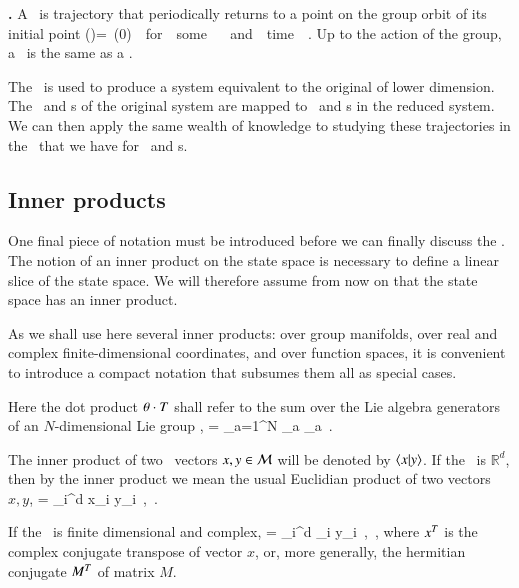 \begin{definition}
\textbf{\Rpo.}
A \rpo\ is trajectory that periodically returns to a point on the group orbit of its initial point
\beq
\ssp(\tau*)=\LieEl \, \ssp(0) \,\, for \,\,  some \,\, \LieEl \in \Group \,\, and \,\, time \,\, \tau*.
\eeq
Up to the action of the group, a \rpo\ is the same as a \po.
\end{definition}

The \mslices\ is used to produce a system equivalent to the original of lower dimension. The \reqva\ and \rpo s of the original system are mapped to \eqva\ and \po s in the reduced system. We can then apply the same wealth of knowledge to studying these trajectories in the \reducedsp\ that we have for \eqva\ and \po s.
    \ifarticle
    \else


\subsection{Inner products}
\label{def:innerProduct}

One final piece of notation must be introduced before we can finally discuss the \mslices.
The notion of an inner product on the state space is necessary to define a linear slice of the state space. We will therefore assume from now on that the state space has an inner product.

As we shall use here several inner products:
over group manifolds, over real and complex finite-dimensional coordinates, and over function spaces, it is convenient to introduce a compact notation that subsumes them all as special cases.

Here the dot product ${\bf \theta} \cdot T$ shall refer to the sum over
the Lie algebra generators of an $N$-dimensional Lie group \Group,
\beq
\gSpace \cdot \Lg = \sum_{a=1}^N \gSpace_a \Lg_a
\,.

The inner product of two \statesp\ vectors $x, y \in {\cal M}$ will be denoted by $\left\langle {x}|{y} \right\rangle$. If the \statesp\ is $\mathbb{R}^d$, then by the inner product we mean the usual Euclidian product of two vectors $x,y$,
\beq
{} = \sum_i^d {x}_i y_i
    \,,\qquad \pS \subset \reals
\,.

If the \statesp\ is finite dimensional and complex,
\beq
{} = \sum_i^d _i y_i
    \,,\qquad \pS \subset \complex
\,,
where ${x}^T$ is the complex conjugate transpose of vector $x$, or, more generally, the hermitian conjugate ${M}^T$ of matrix $M$.

